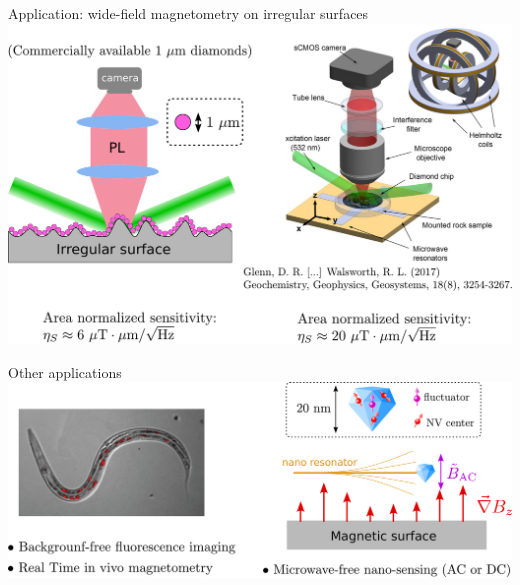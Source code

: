 \documentclass{beamer}
\begin{document}
\begin{frame}{Application: wide-field magnetometry on irregular surfaces}
\centering
\includegraphics[width=\textwidth,height=0.9\textheight,keepaspectratio]{Slide_applications_wide_field}
\end{frame}

\begin{frame}{Other applications}
\centering
\includegraphics[width=\textwidth,height=0.9\textheight,keepaspectratio]{Slide_application_autre}
\end{frame}

%
\end{document}
